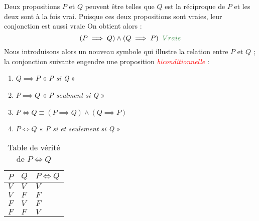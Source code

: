 \documentclass[16pt]{report}
\begin{document}
\begin{multicols*}{2}
                Deux propositions $P$ et $Q$ peuvent être telles que $Q$ est la réciproque de $P$ et les 
                deux sont à la fois vrai. Puisque ces deux propositions sont vraies, leur conjonction est aussi vraie 
                On obtient alors : 
                \[ (P \implies Q) \land (Q \implies P) \;\; \textcolor{myg}{Vraie}  \]
                Nous introduisons alors un nouveau symbole qui illustre la relation entre $P$ et $Q$ ; la conjonction 
                suivante engendre une proposition \textcolor{red}{\textit{biconditionnelle}} : 
                \begin{enumerate}
                    \item $Q \implies P$ « \textit{P si Q} »
                    \item $P \implies Q$ « \textit{P seulment si Q} » \\
                    \item $ P \Leftrightarrow  Q \equiv (P \implies Q) \land (Q \implies P)$  
                    \item $ P \Leftrightarrow  Q $ « \textit{P si et seulement si Q} » 
                \end{enumerate}

            
 
            \begin{table}[H]
            \caption {Table de vérité de $P \Leftrightarrow Q$}
                  \begin{center}
                   \renewcommand{\arraystretch}{1.5}
                   \selectfont
                    \normalsize
                        \begin{tabular}{|l|l||l|}
                        \arrayrulecolor{blue}\hline
                        \rowcolor{lightBlue}
                        \textcolor{myb}{$P$} & \textcolor{myb}{$Q$} & \textcolor{myb}{$P \Leftrightarrow Q$}   
                        \\
                        \hline
                        \hline
                        \arrayrulecolor{black}
                        $V$ & $V$ & \cellcolor{myg} $V$
                        \\
                        \hline
                        $V$ & $F$ & \cellcolor{myr} $F$ 
                        \\
                        \hline
                        $F$ & $V$ & \cellcolor{myr} $F$ 
                        \\
                        \hline 
                        $F$ & $F$ & \cellcolor{myg} $V$ 
                        \\ 
                        \hline
                        \end{tabular}
                \end{center}
            \end{table}
            

\end{multicols*}
\end{document}
